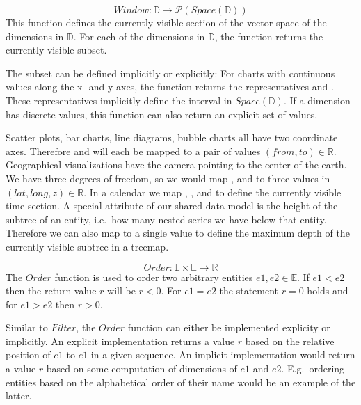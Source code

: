 \begin{equation} Window: \mathbb{D} \rightarrow \mathcal{P}(Space(\mathbb{D})) \end{equation}
  This function defines the currently visible section of the vector space of the dimensions in $\mathbb{D}$.
  For each of the dimensions in $\mathbb{D}$, the function returns the currently visible subset.

  The subset can be defined implicitly or explicitly:
  For charts with continuous values along the x- and y-axes, the function returns the representatives  and .
  These representatives implicitly define the interval in $Space(\mathbb{D})$.
  If a dimension has discrete values, this function can also return an explicit set of values.

  Scatter plots, bar charts, line diagrams, bubble charts all have two coordinate axes.
  Therefore  and  will each be mapped to a pair of values $(from,to) \in \mathbb{R}$.
  Geographical visualizations have the camera pointing to the center of the earth.
  We have three degrees of freedom, so we would map ,  and  to three values in $(lat,long,z) \in \mathbb{R}$.
  In a calendar we map , ,  and  to define the currently visible time section.
  A special attribute of our shared data model is the height of the subtree of an entity, i.e.\ how many nested series we have below that entity.
  Therefore we can also map  to a single value to define the maximum depth of the currently visible subtree in a treemap.

\begin{equation} Order: \mathbb{E} \times \mathbb{E} \rightarrow \mathbb{R} \end{equation}
  The $Order$ function is used to order two arbitrary entities $e1, e2 \in \mathbb{E}$.
  If $e1 < e2$ then the return value $r$ will be $ r < 0 $.
  For $e1 = e2$ the statement $r = 0$ holds and for $e1 > e2$ then $r > 0$.

  Similar to $Filter$, the $Order$ function can either be implemented explicity or implicitly.
  An explicit implementation returns a value $r$ based on the relative position of $e1$ to $e1$ in a given sequence.
  An implicit implementation would return a value $r$ based on some computation of dimensions of $e1$ and $e2$.
  E.g.\ ordering entities based on the alphabetical order of their name would be an example of the latter.

